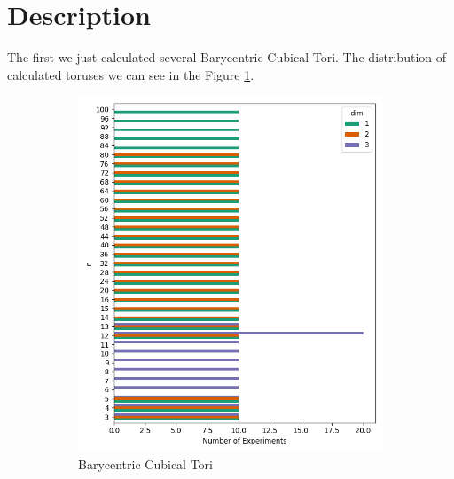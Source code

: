 \documentclass{article}
\begin{document}
\section{Description}
\par The first we just calculated several Barycentric Cubical Tori. The distribution of calculated toruses we can see in the Figure \ref{fig:cases_distribution}.
\begin{figure}[htbp]
    \centering
    \begin{subfigure}[t]{0.45\textwidth}
        \centering
        \includegraphics[width=\textwidth]{pics/torus scores/cases.png}
        \caption{Barycentric Cubical Tori}
        \label{fig:cases_distribution}
    \end{subfigure}
    \hfill
    \begin{subfigure}[t]{0.45\textwidth}
        \centering

\end{subfigure}
\end{figure}
\end{document}
